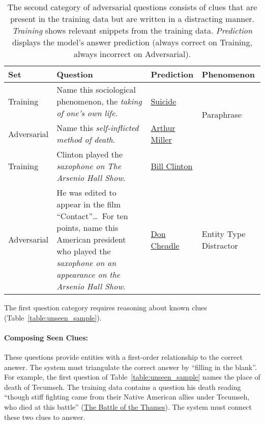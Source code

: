 \begin{table*}[t]
\centering
\begin{tabular}{p{1.75cm}p{8.5cm}lp{2cm}}
\hline
         Set & Question    & Prediction      & Phenomenon                  \\ \hline

Training & Name this sociological phenomenon, the \emph{taking of one's own life}. & \underline{Suicide} & \multirow{2}{*}{Paraphrase} \\
Adversarial  & Name this \emph{self-inflicted method of death}. & \underline{Arthur Miller} & \\ \hline

Training &  Clinton played the \emph{saxophone on The Arsenio Hall Show}.  & \underline{Bill Clinton} &  \\ 
Adversarial & He was edited to appear in the film ``Contact''\dots\ For ten points, name this American president who played the \emph{saxophone on an appearance on the Arsenio Hall Show}. & \underline{Don Cheadle} & Entity Type Distractor \\ \hline

\end{tabular}
\caption{The second category of adversarial questions consists of clues that are present in the training data but are written in a distracting manner. \emph{Training} shows relevant snippets from the training data. \emph{Prediction} displays the  model's answer prediction (always correct on Training, always incorrect on Adversarial).}
\label{table:rewrite_sample}
\end{table*}

The first question category requires reasoning about known clues (Table~\ref{table:unseen_sample}).~\smallskip

\paragraph{Composing Seen Clues:} These questions provide entities with a first-order
relationship to the correct answer. The system must 
triangulate the correct answer by ``filling in the blank''. For
example, the first question of Table~\ref{table:unseen_sample} names the
place of death of Tecumseh. The training data contains a
question his death reading
``though stiff fighting came from their Native American allies under
Tecumseh, who died at this battle'' (\underline{The Battle of the Thames}). The system must connect these two
clues to answer.~\smallskip

